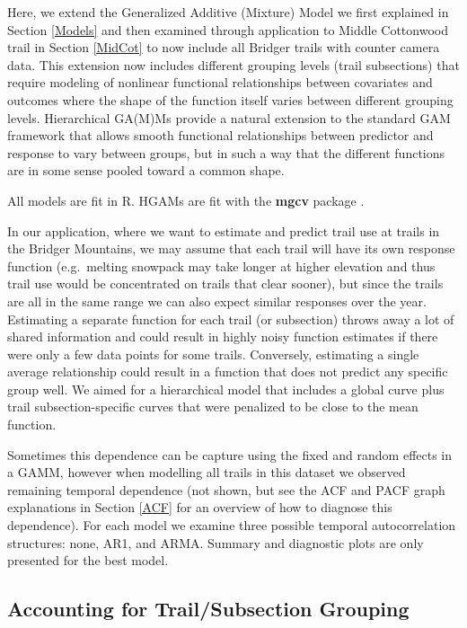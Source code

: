 \documentclass[
]{book}
\begin{document}
Here, we extend the Generalized Additive (Mixture) Model we first explained in Section \ref{Models} and then examined through application to Middle Cottonwood trail in Section \ref{MidCot} to now include all Bridger trails with counter camera data. This extension now includes different grouping levels (trail subsections) that require modeling of nonlinear functional relationships between covariates and outcomes where the shape of the function itself varies between different grouping levels. Hierarchical GA(M)Ms provide a natural extension to the standard GAM framework that allows smooth functional relationships between predictor and response to vary between groups, but in such a way that the different functions are in some sense pooled toward a common shape.

All models are fit in R. HGAMs are fit with the \textbf{mgcv} package \citep[\citet{R-Wood2}, \citet{R-Wood3}, \citet{R-Wood4}, \citet{R-Wood5}]{R-Wood1}.

In our application, where we want to estimate and predict trail use at trails in the Bridger Mountains, we may assume that each trail will have its own response function (e.g.~melting snowpack may take longer at higher elevation and thus trail use would be concentrated on trails that clear sooner), but since the trails are all in the same range we can also expect similar responses over the year. Estimating a separate function for each trail (or subsection) throws away a lot of shared information and could result in highly noisy function estimates if there were only a few data points for some trails. Conversely, estimating a single average relationship could result in a function that does not predict any specific group well. We aimed for a hierarchical model that includes a global curve plus trail subsection-specific curves that were penalized to be close to the mean function.

Sometimes this dependence can be capture using the fixed and random effects in a GAMM, however when modelling all trails in this dataset we observed remaining temporal dependence (not shown, but see the ACF and PACF graph explanations in Section \ref{ACF} for an overview of how to diagnose this dependence). For each model we examine three possible temporal autocorrelation structures: none, AR1, and ARMA. Summary and diagnostic plots are only presented for the best model.

\hypertarget{accounting-for-trailsubsection-grouping}{%
\subsection{Accounting for Trail/Subsection Grouping}\label{accounting-for-trailsubsection-grouping}}
\end{document}

